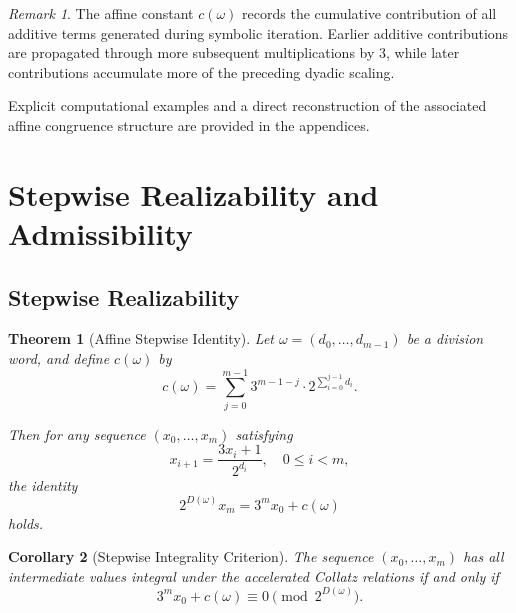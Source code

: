 \documentclass[12pt, oneside]{article}
\numberwithin{equation}{section}
\theoremstyle{definition}
\theoremstyle{plain}
\newtheorem{theorem}{Theorem}[section]
\newtheorem{corollary}[theorem]{Corollary}
\theoremstyle{remark}
\newtheorem*{remark}{Remark}
\begin{document}
\begin{remark}
The affine constant \(c(\omega)\) records the cumulative contribution
of all additive terms generated during symbolic iteration. Earlier
additive contributions are propagated through more subsequent multiplications
by 3, while later contributions accumulate more of the preceding dyadic scaling.

Explicit computational examples and a direct reconstruction of the
associated affine congruence structure are provided in the appendices.
\end{remark}

\section{Stepwise Realizability and Admissibility}
\label{sec:stepwise-realizability-admissibility}

\subsection{Stepwise Realizability}

\begin{theorem}[Affine Stepwise Identity]
\label{thm:affine-stepwise-identity}
Let $\omega = (d_0,\dots,d_{m-1})$ be a division word, and define $c(\omega)$ by
\[
c(\omega)
=
\sum_{j=0}^{m-1}
3^{m-1-j}\cdot 2^{\sum_{i=0}^{j-1} d_i}.
\]

Then for any sequence $(x_0,\dots,x_m)$ satisfying
\[
x_{i+1} = \frac{3x_i+1}{2^{d_i}}, \quad 0 \le i < m,
\]
the identity
\[
2^{D(\omega)} x_m = 3^m x_0 + c(\omega)
\]
holds.
\end{theorem}

\begin{corollary}[Stepwise Integrality Criterion]
The sequence $(x_0,\dots,x_m)$ has all intermediate values integral
under the accelerated Collatz relations if and only if
\[
3^m x_0 + c(\omega) \equiv 0 \pmod{2^{D(\omega)}}.
\]
\end{corollary}
\end{document}
